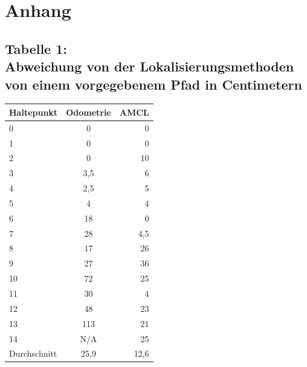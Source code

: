\documentclass[11pt,a4paper]{article}
\begin{document}
\section{Anhang}
\subsection*{Tabelle 1: \\ Abweichung von der Lokalisierungsmethoden von einem vorgegebenem Pfad in Centimetern}
\begin{center}
\begin{tabular}{l|c|r}
\textbf{Haltepunkt} & \textbf{Odometrie} & \textbf{AMCL} \\
	\hline
0&	0&	0\\
1&	0&	0\\
2&	0&	10\\
3&	3,5&	6\\
4&	2,5&	5\\
5&	4&	4\\
6&	18&	0\\
7&	28&	4,5\\
8&	17&	26\\
9&	27&	36\\
10&	72&	25\\
11&	30&	4\\
12&	48&	23\\
13&	113&	21\\
14& N/A	&	25\\
\hline
Durchschnitt& 25,9& 12,6 \\

\end{tabular}
\end{center}

{%

}
\end{document}
